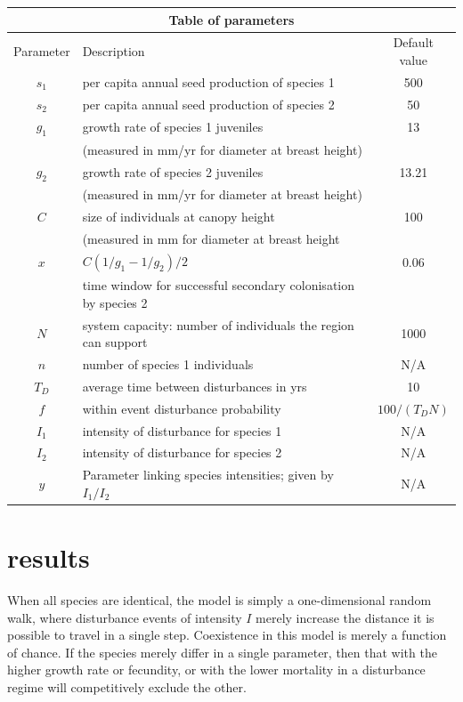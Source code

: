 \documentclass[preprint,10pt,reqno]{amsart}
\begin{document}
\begin{center}
\begin{tabular}{|c|l|c|} \hline
\multicolumn{3}{|c|}{Table of parameters} \\ \hline
Parameter & Description & Default value \\ \hline
$s_1$ & per capita annual seed production of species 1 & 500 \\ \hline
$s_2$ & per capita annual seed production of species 2 & 50\\ \hline
$g_1$&growth rate of species 1 juveniles & 13 \\
&(measured in mm/yr for diameter at breast height) &\\ \hline
$g_2$&growth rate of species 2 juveniles & 13.21 \\
&(measured in mm/yr for diameter at breast height) &\\ \hline
$C$& size of individuals at canopy height & 100 \\
& (measured in mm for diameter at breast height&\\ \hline
$x$&$C(1/g_1-1/g_2)/2$&0.06\\
&time window for successful secondary colonisation by species 2&\\ \hline
$N$ & system capacity: number of individuals the region can support & 1000 \\ \hline
$n$ & number of species 1 individuals & N/A \\ \hline
$T_D$& average time between disturbances in yrs & 10 \\ \hline
$f$& within event disturbance probability & $100/(T_D N)$ \\ \hline
$I_1$& intensity of disturbance for species 1 & N/A \\ \hline
$I_2$& intensity of disturbance for species 2 & N/A \\ \hline
$y$ &Parameter linking species intensities; given by $I_1/I_2$ & N/A \\ \hline
\end{tabular} \end{center}

\section{results}
When all species are identical, the model is simply a one-dimensional random walk, where disturbance events of intensity $I$ merely increase the distance it is possible to travel in a single step. Coexistence in this model is merely a function of chance. If the species merely differ in a single parameter, then that with the higher growth rate or fecundity, or with the lower mortality in a disturbance regime will competitively exclude the other.
\end{document}
